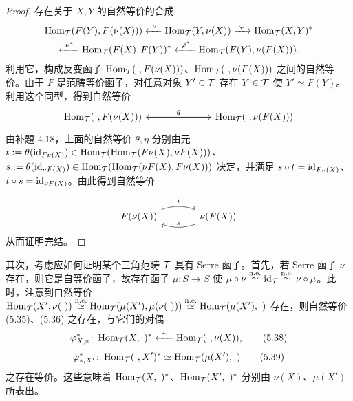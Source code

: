 \begin{proof}
存在关于 $X,Y$ 的自然等价的合成
\[
\begin{gathered}
  \Hom_{\cT}(F(Y),F(\nu(X))) \xleftarrow{\ \nu\ } \Hom_{\cT}(Y,\nu(X)) \xrightarrow{\ \varphi\ } \Hom_{\cT}(X,Y)^{*}\\
  \xleftarrow{\ \nu^{*}\ } \Hom_{\cT}(F(X),F(Y))^{*} \xleftarrow{\ \varphi^{*}\ } \Hom_{\cT}(F(Y),\nu(F(X))).
\end{gathered}
\]
利用它，构成反变函子 $\operatorname{Hom}_{\mathcal{T}}(\ ,F(\nu(X)))$、$\operatorname{Hom}_{\mathcal{T}}(\ ,\nu(F(X)))$ 之间的自然等价。由于 $F$ 是范畴等价函子，对任意对象 $Y' \in \mathcal{T}$ 存在 $Y \in \mathcal{T}$ 使 $Y' \simeq F(Y)$。利用这个同型，得到自然等价
\[
\begin{tikzcd}[row sep=2.2em, column sep=3.4em]
  \Hom_{\cT}(\ ,F(\nu(X))) \arrow[rr,"\theta"] & & \Hom_{\cT}(\ ,\nu(F(X))) \arrow[ll,"\eta"']
\end{tikzcd}
\]
由补題 4.18，上面的自然等价 $\theta,\eta$ 分别由元 $t := \theta(\mathrm{id}_{F\nu(X)}) \in \operatorname{Hom}_{\mathcal{T}}(\operatorname{Hom}_{\mathcal{T}}(F\nu(X),\nu F(X)))$、$s := \theta(\mathrm{id}_{\nu F(X)}) \in \operatorname{Hom}_{\mathcal{T}}(\operatorname{Hom}_{\mathcal{T}}(\nu F(X),F\nu(X)))$ 决定，并满足 $s\circ t = \mathrm{id}_{F\nu(X)}$、$t\circ s = \mathrm{id}_{\nu F(X)}$。由此得到自然等价

\[
\begin{tikzcd}[row sep=2.4em, column sep=3.6em]
  F(\nu(X)) \arrow[r, bend left=18, "t"] & \nu(F(X)) \arrow[l, bend left=18, "s"']
\end{tikzcd}
\]
从而证明完结。
\end{proof}


其次，考虑应如何证明某个三角范畴 $\mathcal{T}$ 具有 Serre 函子。首先，若 Serre 函子 $\nu$ 存在，则它是自等价函子，故存在函子 $\mu \colon S \to S$ 使 $\mu\circ\nu \overset{\mathrm{n.e.}}{\simeq} \mathrm{id}_{\mathcal{T}} \overset{\mathrm{n.e.}}{\simeq} \nu\circ\mu$。此时，注意到自然等价 $\operatorname{Hom}_{\mathcal{T}}(X',\nu(\ )) \overset{\mathrm{n.e.}}{\simeq} \operatorname{Hom}_{\mathcal{T}}(\mu(X'),\mu(\nu(\ ))) \overset{\mathrm{n.e.}}{\simeq} \operatorname{Hom}_{\mathcal{T}}(\mu(X'),\ )$ 存在，则自然等价 (5.35)、(5.36) 之存在，与它们的对偶
\begin{equation}
  \varphi^{*}_{X,*} \colon \operatorname{Hom}_{\mathcal{T}}(X,\ )^{*} \xleftarrow{\ \sim\ } \operatorname{Hom}_{\mathcal{T}}(\ ,\nu(X)), \tag{5.38}
\end{equation}
\begin{equation}
  \varphi^{*}_{*,X'} \colon \operatorname{Hom}_{\mathcal{T}}(\ ,X')^{*} \simeq \operatorname{Hom}_{\mathcal{T}}(\mu(X'),\ ) \tag{5.39}
\end{equation}
之存在等价。这些意味着 $\operatorname{Hom}_{\mathcal{T}}(X,\ )^{*}$、$\operatorname{Hom}_{\mathcal{T}}(X',\ )^{*}$ 分别由 $\nu(X)$、$\mu(X')$ 所表出。

